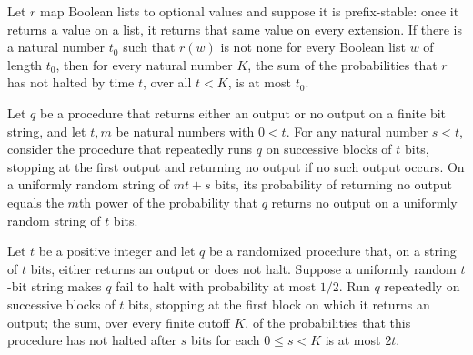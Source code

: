 \begin{theorem}
\label{Randomized.expTimeLe_of_forall_ne_none}
\leanok
{}
Let $r$ map Boolean lists to optional values and suppose it is prefix-stable: once it
returns a value on a list, it returns that same value on every extension. If there is a
natural number $t_0$ such that $r(w)$ is not none for every Boolean list $w$ of length
$t_0$, then for every natural number $K$, the sum of the probabilities that $r$ has not
halted by time $t$, over all $t<K$, is at most $t_0$.
\end{theorem}

\begin{theorem}
\label{Randomized.notHaltedProb_repeatRun}
\leanok
{}
Let $q$ be a procedure that returns either an output or no output on a finite bit
string, and let $t,m$ be natural numbers with $0<t$. For any natural number $s<t$,
consider the procedure that repeatedly runs $q$ on successive blocks of $t$ bits,
stopping at the first output and returning no output if no such output occurs. On a
uniformly random string of $mt+s$ bits, its probability of returning no output equals
the $m$th power of the probability that $q$ returns no output on a uniformly random
string of $t$ bits.
\end{theorem}

\begin{theorem}
\label{Randomized.expTimeLe_repeatRun}
\leanok
{}
Let $t$ be a positive integer and let $q$ be a randomized procedure that, on a string of
$t$ bits, either returns an output or does not halt. Suppose a uniformly random $t$-bit
string makes $q$ fail to halt with probability at most $1/2$. Run $q$ repeatedly on
successive blocks of $t$ bits, stopping at the first block on which it returns an
output; the sum, over every finite cutoff $K$, of the probabilities that this procedure
has not halted after $s$ bits for each $0 \le s < K$ is at most $2t$.
\end{theorem}

